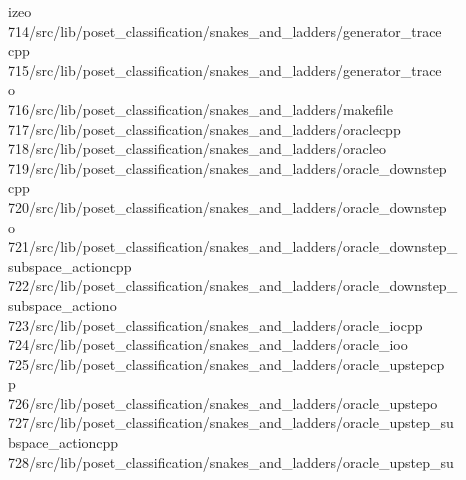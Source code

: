 \begin{tabbing}
\>izeo\\[0pt]
714\>/src/lib/poset\_classification/snakes\_and\_ladders/generator\_trace\\[0pt]
\>cpp\\[0pt]
715\>/src/lib/poset\_classification/snakes\_and\_ladders/generator\_trace\\[0pt]
\>o\\[0pt]
716\>/src/lib/poset\_classification/snakes\_and\_ladders/makefile\\[0pt]
717\>/src/lib/poset\_classification/snakes\_and\_ladders/oraclecpp\\[0pt]
718\>/src/lib/poset\_classification/snakes\_and\_ladders/oracleo\\[0pt]
719\>/src/lib/poset\_classification/snakes\_and\_ladders/oracle\_downstep\\[0pt]
\>cpp\\[0pt]
720\>/src/lib/poset\_classification/snakes\_and\_ladders/oracle\_downstep\\[0pt]
\>o\\[0pt]
721\>/src/lib/poset\_classification/snakes\_and\_ladders/oracle\_downstep\_\\[0pt]
\>subspace\_actioncpp\\[0pt]
722\>/src/lib/poset\_classification/snakes\_and\_ladders/oracle\_downstep\_\\[0pt]
\>subspace\_actiono\\[0pt]
723\>/src/lib/poset\_classification/snakes\_and\_ladders/oracle\_iocpp\\[0pt]
724\>/src/lib/poset\_classification/snakes\_and\_ladders/oracle\_ioo\\[0pt]
725\>/src/lib/poset\_classification/snakes\_and\_ladders/oracle\_upstepcp\\[0pt]
\>p\\[0pt]
726\>/src/lib/poset\_classification/snakes\_and\_ladders/oracle\_upstepo\\[0pt]
727\>/src/lib/poset\_classification/snakes\_and\_ladders/oracle\_upstep\_su\\[0pt]
\>bspace\_actioncpp\\[0pt]
728\>/src/lib/poset\_classification/snakes\_and\_ladders/oracle\_upstep\_su\\[0pt]

\end{tabbing}
